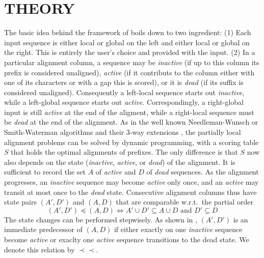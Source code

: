 \documentclass[a4paper,10pt]{article}
\newcommand{\pprec}{\mathrel{\prec\!\!\!\prec}}
\begin{document}
\section{\uppercase{Theory}}

The basic idea behind the framework of \cite{Retzlaff:18a} boils down to
two ingredient: (1) Each input sequence is either local or global on the
left and either local or global on the right. This is entirely the user's
choice and provided with the input. (2) In a particular alignment column, a
sequence may be \textit{inactive} (if up to this column its prefix is
considered unaligned), \textit{active} (if it contributs to the column
either with one of its characters or with a gap this is scored), or it is
\textit{dead} (if its suffix is considered unaligned). Consequently a
left-local sequence starts out \textit{inactive}, while a left-global
sequence starts out \textit{active}. Correspondingly, a right-global input
is still \textit{active} at the end of the aligment, while a right-local
sequence must be \textit{dead} at the end of the alignment. As in the well
known Needleman-Wunsch \cite{Needleman:70} or Smith-Waterman
\cite{Smith:81} algorithms and their 3-way extensions \cite{Gotoh:86}, the
partially local alignment problems can be solved by dynamic programming,
with a scoring table $S$ that holds the optimal alignments of prefixes. The
only difference is that $S$ now also depends on the state
(\textit{inactive}, \textit{active}, or \textit{dead}) of the alignment. It
is sufficient to record the set $A$ of \textit{active} and $D$ of
\textit{dead} sequences. As the alignment progresses, an \textit{inactive}
sequence may become \textit{active} only once, and an \textit{active} may
transit at most once to the \textit{dead} state. Consecutive alignment
columns thus have state pairs $(A',D')$ and $(A,D)$ that are comparable
w.r.t.\ the partial order
\begin{equation}
  (A',D')\preceq(A,D) \iff A'\cup D'\subseteq A\cup D
  \textrm{ and } D'\subseteq D
\end{equation}
The state changes can be performed stepwisely. As shown in
\cite{Retzlaff:18a}, $(A',D')$ is an immediate predecessor of $(A,D)$
if either exactly on one \textit{inactive} sequence become \textit{active}
or exaclty one  \textit{active} sequence transitions to the dead state.
We denote this relation by $\pprec$.
 
\end{document}
